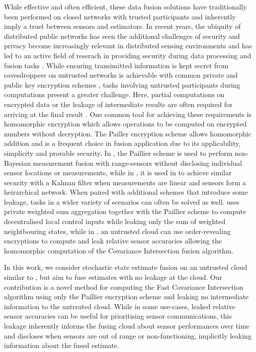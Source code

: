 \documentclass[letterpaper, 10 pt, conference]{ieeeconf}
\begin{document}
While effective and often efficient, these data fusion solutions have traditionally been performed on closed networks with trusted participants and inherently imply a trust between sensors and estimators. In recent years, the ubiquity of distributed public networks has seen the additional challenges of security and privacy become increasingly relevant in distributed sensing environments and has led to an active field of reserach in providing security during data processing and fusion tasks \cite{renSecurityChallengesPublic2012,brennerSecretProgramExecution2011}. While ensuring transimitted information is kept secret from eavesdroppers on untrusted networks is achievable with common private and public key encryption schemes \cite{katzIntroductionModernCryptography2008}, tasks involving untrusted participants during computations present a greater challenge. Here, partial computations on encrypted data or the leakage of intermediate results are often required for arriving at the final result \cite{risticSecureFastCovariance2021,shiPrivacyPreservingAggregationTimeSeries2011}. One common tool for achieving these requirements is homomorphic encryption \cite{gentryFullyHomomorphicEncryption2009,paillierPublicKeyCryptosystemsBased1999} which allows operations to be computed on encrypted numbers without decryption. The Pailler encryption scheme \cite{paillierPublicKeyCryptosystemsBased1999} allows homomorphic addition and is a frequent choice in fusion application due to its applicability, simplicity and provable security. In \cite{alanwarPrOLocResilientLocalization2017}, the Paillier scheme is used to perform non-Bayesian measurement fusion with range-sensors without disclosing individual sensor locations or measurements, while in \cite{aristovEncryptedMultisensorInformation2018}, it is used in to achieve similar security with a Kalman filter when measurements are linear and sensors form a heirarchical network. When paired with additional schemes that introduce some leakage, tasks in a wider variety of scenarios can often be solved as well. \cite{alexandruEncryptedCooperativeControl2019} uses private weighted sum aggregation together with the Paillier scheme to compute decentralised local control inputs while leaking only the sum of weighted neightbouring states, while in \cite{risticSecureFastCovariance2021}, an untrusted cloud can use order-revealing encryptions to compute and leak relative sensor accuracies allowing the homomorphic computation of the Covariance Intersection fusion algorithm.

In this work, we consider stochastic state estimate fusion on an untrusted cloud similar to \cite{risticSecureFastCovariance2021}, but aim to fuse estimates with no leakage at the cloud. Our contribution is a novel method for computing the Fast Covariance Intersection algorithm using only the Paillier encryption scheme and leaking no intermediate information to the untrsuted cloud. While in some use-cases, leaked relative sensor accuracies can be useful for prioritising sensor communications, this leakage inherently informs the fusing cloud about sensor performances over time and discloses when sensors are out of range or non-functioning, implicitly leaking information about the fused estimate.
\end{document}
